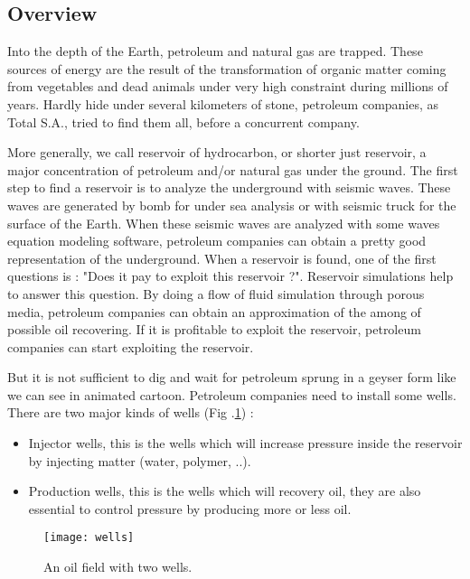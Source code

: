 \subsection{Overview}

%
Into the depth of the Earth, petroleum and natural gas are trapped.
%
These sources of energy are the result of the transformation of organic matter coming from vegetables and dead animals under very high constraint during millions of years.
%
Hardly hide under several kilometers of stone, petroleum companies, as Total S.A., tried to find them all, before a concurrent company.



More generally, we call reservoir of hydrocarbon, or shorter just reservoir, a major concentration of petroleum and/or natural gas under the ground.
%
The first step to find a reservoir is to analyze the underground with seismic waves.
%
These waves are generated by bomb for under sea analysis or with seismic truck for the surface of the Earth.
%
When these seismic waves are analyzed with some waves equation modeling software, petroleum companies can obtain a pretty good representation of the underground.
%
When a reservoir is found, one of the first questions is : "Does it pay to exploit this reservoir ?".
%
Reservoir simulations help to answer this question.
%
By doing a flow of fluid simulation through porous media, petroleum companies can obtain an approximation of the among of possible oil recovering.
%
If it is profitable to exploit the reservoir, petroleum companies can start exploiting the reservoir.



But it is not sufficient to dig and wait for petroleum sprung in a geyser form like we can see in animated cartoon.
%
Petroleum companies need to install some wells.
%
There are two major kinds of wells (Fig .\ref{fig:wells}) :
%
\begin{itemize}
  \item Injector wells, this is the wells which will increase pressure inside the reservoir by injecting matter (water, polymer, ..).
  \item Production wells, this is the wells which will recovery oil, they are also essential to control pressure by producing more or less oil.
\end{itemize}

\begin{figure}[!ht]
  \centering
  \texttt{[image: wells]}
  \caption{An oil field with two wells.}
\label{fig:wells}
\end{figure}


